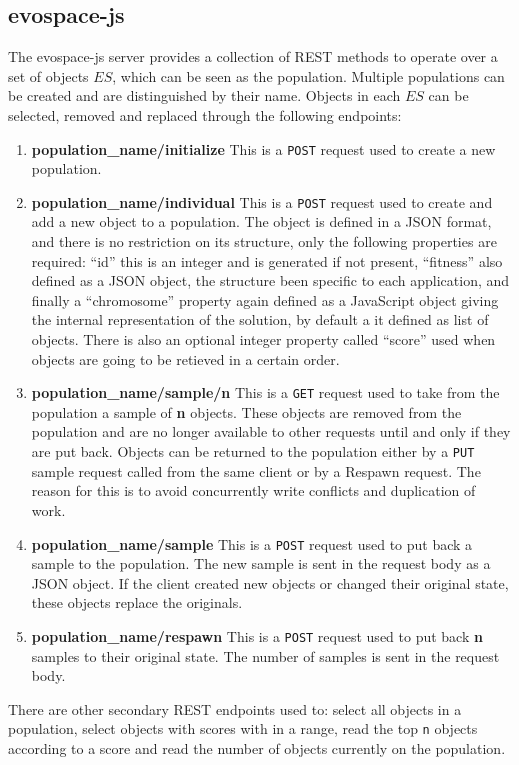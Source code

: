 \subsection{{\sf evospace-js}} %
 \label{sec:evospace}
The {\sf evospace-js} server provides a collection of REST methods  
to operate over a set of objects $ES$, which can be seen as the 
population. Multiple populations can be created and are 
distinguished by their name. Objects in each $ES$ 
can be selected, removed and replaced through the 
following endpoints:
\begin{enumerate}
    \item {\bf population\_name/initialize} 
    This is a {\tt POST} request used to create a new population.
    \item {\bf population\_name/individual} 
    This is a {\tt POST} request used to create and add a new object
    to a population. The object is defined in a JSON format, 
    and there is no restriction on its structure, only 
    the following properties are required: ``id'' this is an 
    integer and is generated if not present, ``fitness'' also defined 
    as a JSON object, the structure been specific to each application, 
    and finally a ``chromosome'' property again defined as
    a JavaScript object giving the internal representation of 
    the solution, by default a it defined as list of objects. 
    There is also an optional integer property called 
    ``score'' used when objects are going to be retieved in a certain order.
    \item {\bf population\_name/sample/n}
    This is a {\tt GET}  request used to take from the population a 
    sample of {\bf n} objects. These objects are removed from the 
    population and are no longer available
    to other requests until and only if they are put back. 
    Objects can be returned to the population 
    either by a {\tt PUT} sample request called from the same 
    client or by a Respawn request. The reason for 
    this is to avoid concurrently write conflicts and duplication of work.
    \item {\bf population\_name/sample}
    This is a {\tt POST} request used to put back a sample to the population.
    The new sample is sent in the request body as a JSON object. 
    If the client created new objects or 
    changed their original state, these objects replace the originals. 
    \item {\bf population\_name/respawn}
    This is a {\tt POST} request used to put back {\bf n} samples to their 
    original state. The number of samples is sent in the request body. 
\end{enumerate}
There are other secondary REST endpoints used to: select all objects in a 
population, select objects with scores with in a range, read the 
top {\tt n} objects according to a score and read the number of
objects currently on the population.      

